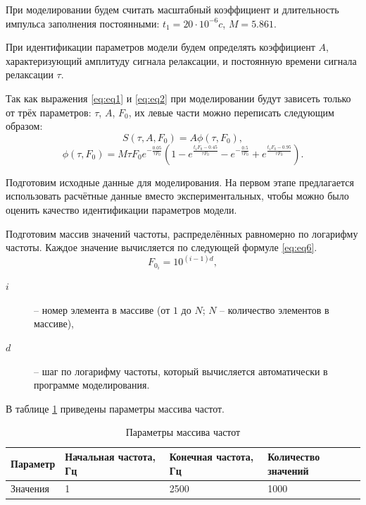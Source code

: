 \documentclass{report}
\begin{document}
        При моделировании будем считать масштабный коэффициент и длительность импульса 
        заполнения постоянными: \(t_1 = 20 \cdot 10^{-6} c\), \(M = 5.861\).

        При идентификации параметров модели будем определять коэффициент $A$, 
        характеризующий амплитуду сигнала релаксации, и постоянную времени сигнала 
        релаксации $\tau$.

        Так как выражения \ref{eq:eq1} и \ref{eq:eq2} при моделировании будут зависеть 
        только от трёх параметров: $\tau$, $A$, $F_0$, их левые части можно переписать 
        следующим образом:
        \begin{equation}
            \label{eq:eq4}
            S\left(\tau,A,F_0\right) = A \phi\left(\tau,F_0\right),
        \end{equation}
        \begin{equation}
            \label{eq:eq5}
            \phi\left(\tau,F_0\right) = 
            M \tau F_0 e^{-\frac{0.05}{\tau F_0}}
            \left(1-e^{\frac{t_1 F_0-0.45}{\tau F_0}}
            -e^{-\frac{0.5}{\tau F_0}}+
            e^{\frac{t_1 F_0-0.95}{\tau F_0}}\right).
        \end{equation}

        Подготовим исходные данные для моделирования. На первом этапе предлагается 
        использовать расчётные данные вместо экспериментальных, чтобы можно было 
        оценить качество идентификации параметров модели. 

        Подготовим массив значений частоты, распределённых равномерно по логарифму 
        частоты. Каждое значение вычисляется по следующей формуле \ref{eq:eq6}.
        \begin{equation}
            \label{eq:eq6}
            F_{0_i} = 10 ^ {\left(i-1\right)d},
        \end{equation}
        \begin{description}
            \item[$i$] -- номер элемента в массиве (от $1$ до $N$; $N$ – количество 
            элементов в массиве),
            \item[$d$] -- шаг по логарифму частоты, который вычисляется 
            автоматически в программе моделирования.
        \end{description}

        В таблице \ref{table:table1} приведены параметры массива частот.

        \begin{table}[ht]
            \label{table:table1}
            \caption{Параметры массива частот}
            \centering
            \begin{tabular}{ | m{2.0cm} | m{2.0cm} | m{2.5cm} | m{2.5cm} | }
                \hline
                Параметр & Начальная частота, Гц & Конечная частота, Гц & Количество значений \\
                \hline
                Значения & 1 & 2500 & 1000 \\
                \hline
            \end{tabular}
        \end{table}
\end{document}
